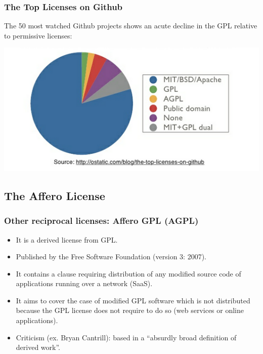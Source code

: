 \documentclass{beamer}
\begin{document}

\begin{frame}
\frametitle{The Top Licenses on Github}

\begin{center}
\small
The 50 most watched Github projects shows an acute decline in the GPL relative to permissive licenses:

\medskip

\includegraphics[scale=0.5,clip=true]{figs/top-licenses-on-github.png}
\end{center}

\end{frame}


\subsection{The Affero License}
\begin{frame}
\frametitle{Other reciprocal licenses: Affero GPL (AGPL)}

\begin{itemize}
\item It is a \alert{derived} license from GPL. 
\item Published by the Free Software Foundation (version 3: 2007).
\item It contains a clause requiring distribution of any modified source code of applications \alert{running over a network} (SaaS).
\item It aims to cover the case of modified GPL software which is not distributed because the GPL license does not require to do so (web services or online applications). 
\item Criticism (ex. Bryan Cantrill): based in a ``absurdly broad definition of derived work''.
\end{itemize}
\end{frame}
\end{document}
